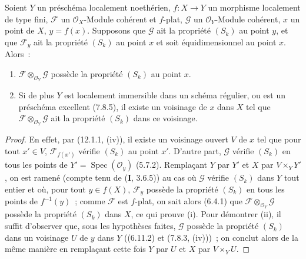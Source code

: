 \begin{corollary}[12.1.5]
\label{IV.12.1.5-fr}
Soient $Y$ un préschéma localement noethérien, $f:X\to Y$ un morphisme
localement de type fini, $\mathcal F$ un $\mathcal O_X$-Module cohérent et
$f$-plat, $\mathcal G$ un $\mathcal O_Y$-Module cohérent, $x$ un point de $X$,
$y=f(x)$. Supposons que $\mathcal G$ ait la propriété $(S_k)$ au point $y$, et
que $\mathcal F_y$ ait la propriété $(S_k)$ au point $x$ et soit
équidimensionnel au point $x$. Alors~:
\begin{enumerate}[label=\textup{(\roman*)}]
  \item $\mathcal F\otimes_{\mathcal O_Y}\mathcal G$ possède la propriété
  $(S_k)$ au point $x$.
  \item Si de plus $Y$ est localement immersible dans un schéma régulier, ou
  est un préschéma excellent \textup{(7.8.5)}, il existe un voisinage de $x$ dans $X$
  tel que $\mathcal F\otimes_{\mathcal O_Y}\mathcal G$ ait la propriété
  $(S_k)$ dans ce voisinage.
\end{enumerate}
\end{corollary}

\begin{proof}
En effet, par (12.1.1, (iv)), il existe un voisinage ouvert $V$ de $x$ tel que
pour tout $x'\in V$, $\mathcal F_{f(x')}$ vérifie $(S_k)$ au point $x'$.
D'autre part, $\mathcal G$ vérifie $(S_k)$ en tous les points de
$Y'=\operatorname{Spec}(\mathcal O_y)$ (5.7.2). Remplaçant $Y$ par $Y'$ et $X$
par $V\times_YY'$, on est ramené (compte tenu de ($\mathbf I$, 3.6.5)) au cas
où $\mathcal G$ vérifie $(S_k)$ dans $Y$ tout entier et où, pour tout
$y\in f(X)$, $\mathcal F_y$ possède la propriété $(S_k)$ en tous les points de
$f^{-1}(y)$~; comme $\mathcal F$ est $f$-plat, on sait alors (6.4.1) que
$\mathcal F\otimes_{\mathcal O_Y}\mathcal G$ possède la propriété $(S_k)$ dans
$X$, ce qui prouve (i). Pour démontrer (ii), il suffit d'observer que, sous les
hypothèses faites, $\mathcal G$ possède la
propriété $(S_k)$ dans un voisinage $U$ de $y$ dans $Y$ ((6.11.2) et (7.8.3,
(iv)))~; on conclut alors de la même manière en remplaçant cette fois $Y$ par
$U$ et $X$ par $V\times_YU$.
\end{proof}

